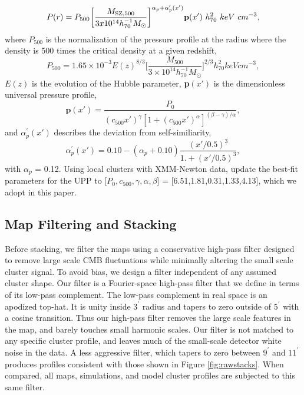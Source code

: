 \documentclass[a4paper,fleqn,usenatbib]{mnras}
\begin{document}
\begin{equation}
P(r) = P_{500} \bigg[ \frac{M_{\rm SZ,500}}{3x10^{14} h^{-1}_{70} M_{\odot}} \bigg]^{\alpha_{p} + \alpha^{\prime}_{p}(x')} \textbf{p}(x') \ h^{2}_{70} \ keV \ cm^{-3},
\end{equation}
where $P_{500}$ is the normalization of the pressure profile at the radius where the density is 500 times the critical density at a given redshift,
\begin{equation}
P_{500} = 1.65 \times 10^{-3} E(z)^{8/3} \bigg[\frac{M_{500}}{3 \times 10^{14} h_{70}^{-1} M_{\odot}}\bigg]^{2/3} h_{70}^2 keV cm^{-3},
\end{equation}
$E(z)$ is the evolution of the Hubble parameter, \textbf{p}$(x')$ is the dimensionless universal pressure profile,
\begin{equation}
\textbf{p}(x') = \frac{P_{0}}{(c_{500} x')^{\gamma} [1 + (c_{500} x')^{\alpha}]^{(\beta-\gamma)/\alpha}},
\end{equation}
and $\alpha^{\prime}_{p}(x')$ describes the deviation from self-similiarity,
\begin{equation}
\alpha^{\prime}_{p}(x') = 0.10 - (\alpha_{p} + 0.10) \frac{(x'/0.5)^{3}}{1. + (x'/0.5)^{3}},
\end{equation}
with $\alpha_p$ = 0.12.
Using local clusters with XMM-Newton data, \cite{2013A&A...550A.131P} update the best-fit parameters for the UPP to [$P_{0},c_{500},\gamma,\alpha,\beta$] = [6.51,1.81,0.31,1.33,4.13], which we adopt in this paper.


\subsection{Map Filtering and Stacking}
Before stacking, we filter the maps using a conservative high-pass filter designed to remove large scale CMB fluctuations while minimally altering the small scale cluster signal. 
To avoid bias, we design a filter independent of any assumed cluster shape.
Our filter is a Fourier-space high-pass filter that we define in terms of its low-pass complement.  
The low-pass complement in real space is an apodized top-hat. 
It is unity inside $3^\prime$ radius and tapers to zero outside of $5^\prime$ with a cosine transition. 
Thus our high-pass filter removes the large scale features in the map, and barely touches small harmonic scales. 
Our filter is not matched to any specific cluster profile, and leaves much of the small-scale detector white noise in the data.  
A less aggressive filter, which tapers to zero between $9^\prime$ and $11^\prime$ produces profiles consistent with those shown in Figure \ref{fig:rawstacks}.
When compared, all maps, simulations, and model cluster profiles are subjected to this same filter. 
\end{document}
